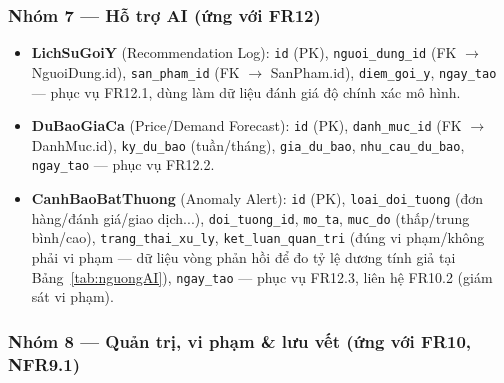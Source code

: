 \subsubsection*{Nhóm 7 --- Hỗ trợ AI (ứng với FR12)}
 
\begin{itemize}
    \item \textbf{LichSuGoiY} (Recommendation Log): \texttt{id} (PK),
    \texttt{nguoi\_dung\_id} (FK $\to$ NguoiDung.id), \texttt{san\_pham\_id}
    (FK $\to$ SanPham.id), \texttt{diem\_goi\_y}, \texttt{ngay\_tao} ---
    phục vụ FR12.1, dùng làm dữ liệu đánh giá độ chính xác mô hình.
    \item \textbf{DuBaoGiaCa} (Price/Demand Forecast): \texttt{id} (PK),
    \texttt{danh\_muc\_id} (FK $\to$ DanhMuc.id), \texttt{ky\_du\_bao}
    (tuần/tháng), \texttt{gia\_du\_bao}, \texttt{nhu\_cau\_du\_bao},
    \texttt{ngay\_tao} --- phục vụ FR12.2.
    \item \textbf{CanhBaoBatThuong} (Anomaly Alert): \texttt{id} (PK),
    \texttt{loai\_doi\_tuong} (đơn hàng/đánh giá/giao dịch...),
    \texttt{doi\_tuong\_id}, \texttt{mo\_ta}, \texttt{muc\_do} (thấp/trung
    bình/cao), \texttt{trang\_thai\_xu\_ly}, \texttt{ket\_luan\_quan\_tri}
    (đúng vi phạm/không phải vi phạm --- dữ liệu vòng phản hồi để đo tỷ lệ
    dương tính giả tại Bảng~\ref{tab:nguongAI}), \texttt{ngay\_tao} --- phục
    vụ FR12.3, liên hệ FR10.2 (giám sát vi phạm).
\end{itemize}

\subsubsection*{Nhóm 8 --- Quản trị, vi phạm \& lưu vết (ứng với FR10, NFR9.1)}

